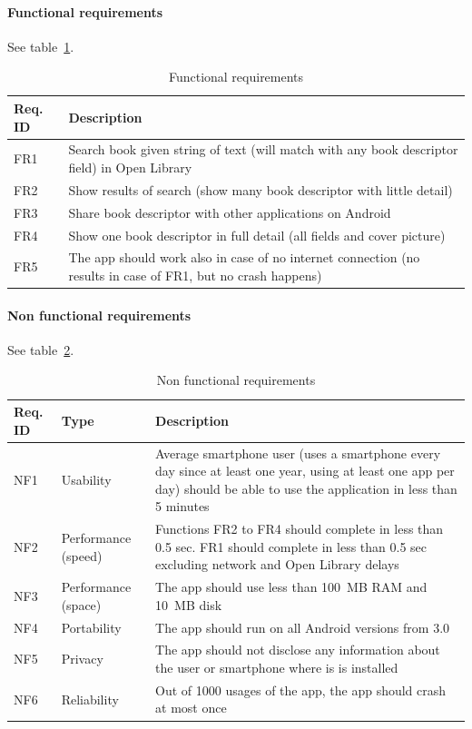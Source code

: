 \paragraph{Functional requirements} See table~\ref{tab:book_functional}.
\begin{table}
\centering
\small
\begin{tabularx}{\textwidth}{|l|X|}
\hline
\textbf{Req. ID} & \textbf{Description} \\
\hline
FR1 & Search book given string of text (will match with any book descriptor field) in Open Library \\
\hline
FR2 & Show results of search (show many book descriptor with little detail) \\
\hline
FR3 & Share book descriptor with other applications on Android \\
\hline
FR4 & Show one book descriptor in full detail (all fields and cover picture) \\
\hline
FR5 & The app should work also in case of no internet connection (no results in case of FR1, but no crash happens) \\
\hline
\end{tabularx}
\caption{Functional requirements}
\label{tab:book_functional}
\end{table}

\paragraph{Non functional requirements} See table~\ref{tab:book_nonfunctional}.

\begin{table}
\centering
\small
\begin{tabularx}{\textwidth}{|l|l|X|}
\hline
\textbf{Req. ID} & \textbf{Type} & \textbf{Description} \\
\hline
NF1 & Usability & Average smartphone user (uses a smartphone every day since at least one year, using at least one app per day) should be able to use the application in less than 5 minutes \\
\hline
NF2 & Performance (speed) & Functions FR2 to FR4 should complete in less than 0.5 sec. FR1 should complete in less than 0.5 sec excluding network and Open Library delays \\
\hline
NF3 & Performance (space) & The app should use less than 100~MB RAM and 10~MB disk \\
\hline
NF4 & Portability & The app should run on all Android versions from 3.0 \\
\hline
NF5 & Privacy & The app should not disclose any information about the user or smartphone where is is installed \\
\hline
NF6 & Reliability & Out of 1000 usages of the app, the app should crash at most once \\
\hline
\end{tabularx}
\caption{Non functional requirements}
\label{tab:book_nonfunctional}
\end{table}

